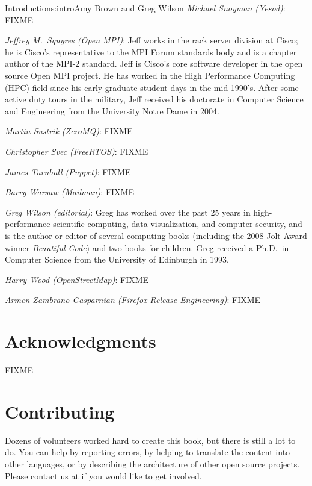 \begin{aosachapter}{Introduction}{s:intro}{Amy Brown and Greg Wilson}
\emph{Michael Snoyman (Yesod)}: FIXME

\emph{Jeffrey M.\ Squyres (Open MPI)}: Jeff works in the rack server
division at Cisco; he is Cisco's representative to the MPI Forum
standards body and is a chapter author of the MPI-2 standard.  Jeff is
Cisco's core software developer in the open source Open MPI project.
He has worked in the High Performance Computing (HPC) field since his
early graduate-student days in the mid-1990's.  After some active duty
tours in the military, Jeff received his doctorate in Computer Science
and Engineering from the University Notre Dame in 2004.

\emph{Martin Sustrik (ZeroMQ)}: FIXME

\emph{Christopher Svec (FreeRTOS)}: FIXME

\emph{James Turnbull (Puppet)}: FIXME

\emph{Barry Warsaw (Mailman)}: FIXME

\emph{Greg Wilson (editorial)}: Greg has worked over the past 25 years
in high-performance scientific computing, data visualization, and
computer security, and is the author or editor of several computing
books (including the 2008 Jolt Award winner \emph{Beautiful Code}) and
two books for children.  Greg received a Ph.D.\ in Computer Science
from the University of Edinburgh in 1993.

\emph{Harry Wood (OpenStreetMap)}: FIXME

\emph{Armen Zambrano Gasparnian (Firefox Release Engineering)}: FIXME

\section*{Acknowledgments}

FIXME

\section*{Contributing}

Dozens of volunteers worked hard to create this book, but there is
still a lot to do.  You can help by reporting errors, by helping to
translate the content into other languages, or by describing the
architecture of other open source projects.  Please contact us at
 if you would like to get involved.

\end{aosachapter}
